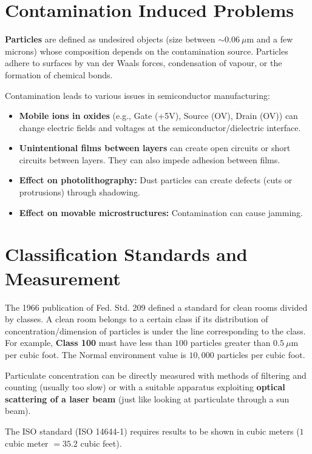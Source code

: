 \documentclass{report}
\begin{document}
\section{Contamination Induced Problems}

\textbf{Particles} are defined as undesired objects (size between $\sim 0.06~\mu \text{m}$ and a few microns) whose composition depends on the contamination source. Particles adhere to surfaces by van der Waals forces, condensation of vapour, or the formation of chemical bonds.

Contamination leads to various issues in semiconductor manufacturing:
\begin{itemize}
    \item \textbf{Mobile ions in oxides} (e.g., Gate (+5V), Source (OV), Drain (OV)) can change electric fields and voltages at the semiconductor/dielectric interface.
    \item \textbf{Unintentional films between layers} can create open circuits or short circuits between layers. They can also impede adhesion between films.
    \item \textbf{Effect on photolithography:} Dust particles can create defects (cuts or protrusions) through shadowing.
    \item \textbf{Effect on movable microstructures:} Contamination can cause jamming.
\end{itemize}

\section{Classification Standards and Measurement}

The 1966 publication of Fed. Std. 209 defined a standard for clean rooms divided by classes. A clean room belongs to a certain class if its distribution of concentration/dimension of particles is under the line corresponding to the class. For example, \textbf{Class 100} must have less than $100$ particles greater than $0.5~\mu \text{m}$ per cubic foot. The Normal environment value is $10,000$ particles per cubic foot.

Particulate concentration can be directly measured with methods of filtering and counting (usually too slow) or with a suitable apparatus exploiting \textbf{optical scattering of a laser beam} (just like looking at particulate through a sun beam).

The ISO standard (ISO 14644-1) requires results to be shown in cubic meters ($1$ cubic meter $= 35.2$ cubic feet).
\end{document}
